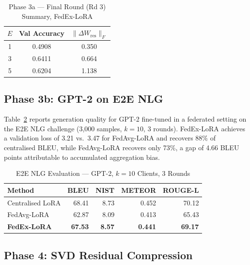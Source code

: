 \documentclass[conference]{IEEEtran}
\begin{document}
\begin{table}[t]
\caption{Phase 3a — Final Round (Rd 3) Summary, FedEx-LoRA}
\label{tab:epochs}
\begin{center}
\begin{tabular}{|c|c|c|}
\hline
\textbf{$E$} & \textbf{Val Accuracy} & \textbf{$\|\Delta W_{\mathrm{res}}\|_F$}\\
\hline
1 & 0.4908 & 0.350 \\
3 & 0.6411 & 0.664 \\
5 & 0.6204 & 1.138 \\
\hline
\end{tabular}
\end{center}
\end{table}

\subsection{Phase 3b: GPT-2 on E2E NLG}

Table~\ref{tab:e2e} reports generation quality for GPT-2 fine-tuned in a
federated setting on the E2E NLG challenge (3,000 samples, $k{=}10$,
3 rounds). FedEx-LoRA achieves a validation loss of 3.21 vs.\ 3.47 for
FedAvg-LoRA and recovers 88\% of centralised BLEU, while FedAvg-LoRA
recovers only 73\%, a gap of 4.66 BLEU points attributable to accumulated
aggregation bias.

\begin{table}[t]
\caption{E2E NLG Evaluation — GPT-2, $k{=}10$ Clients, 3 Rounds}
\label{tab:e2e}
\begin{center}
\begin{tabular}{|l|r|r|r|r|}
\hline
\textbf{Method} & \textbf{BLEU} & \textbf{NIST} & \textbf{METEOR} & \textbf{ROUGE-L}\\
\hline
Centralised LoRA    & 68.41 & 8.73 & 0.452 & 70.12 \\
FedAvg-LoRA         & 62.87 & 8.09 & 0.413 & 65.43 \\
\textbf{FedEx-LoRA} & \textbf{67.53} & \textbf{8.57} & \textbf{0.441} & \textbf{69.17} \\
\hline
\end{tabular}
\end{center}
\end{table}

\subsection{Phase 4: SVD Residual Compression}
\end{document}
